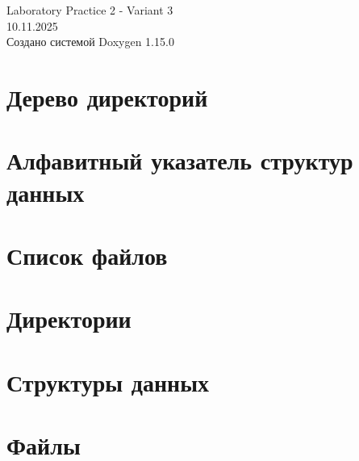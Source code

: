 \documentclass[twoside]{book}
\newcommand{\+}{\discretionary{\mbox{\scriptsize$\hookleftarrow$}}{}{}}
\newcommand{\clearemptydoublepage}{%
    \newpage{\pagestyle{empty}\cleardoublepage}%
  }
\begin{document}
  \raggedbottom
    \hypersetup{pageanchor=false,
                bookmarksnumbered=true,
                pdfencoding=unicode
               }
  \begin{titlepage}
  \vspace*{7cm}
  \begin{center}%
  {\Large Laboratory Practice 2 -\/ Variant 3}\\
  [1ex]\large 10.\+11.\+2025 \\
  \vspace*{1cm}
  {\large Создано системой Doxygen 1.15.0}\\
  \end{center}
  \end{titlepage}
  \clearemptydoublepage
  \tableofcontents
  \clearemptydoublepage
  \hypersetup{pageanchor=true}
\chapter{Дерево директорий}

\chapter{Алфавитный указатель структур данных}

\chapter{Список файлов}

\chapter{Директории}



\chapter{Структуры данных}

\chapter{Файлы}









  \backmatter
  \newpage
  \clearemptydoublepage
  \printindex
\end{document}
